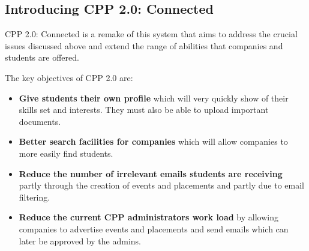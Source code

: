 \subsection{Introducing CPP 2.0: Connected}
CPP 2.0: Connected is a remake of this system that aims to address the crucial issues discussed above and extend the range of abilities that companies and students are offered.

The key objectives of CPP 2.0 are:
\begin{itemize}
  \item \textbf{Give students their own profile} which will very quickly show of their skills set and interests. They must also be able to upload important documents.
  \item \textbf{Better search facilities for companies} which will allow companies to more easily find students.
  \item \textbf{Reduce the number of irrelevant emails students are receiving} partly through the creation of events and placements and partly due to email filtering.
  \item \textbf{Reduce the current CPP administrators work load} by allowing companies to advertise events and placements and send emails which can later be approved by the admins.
\end{itemize}